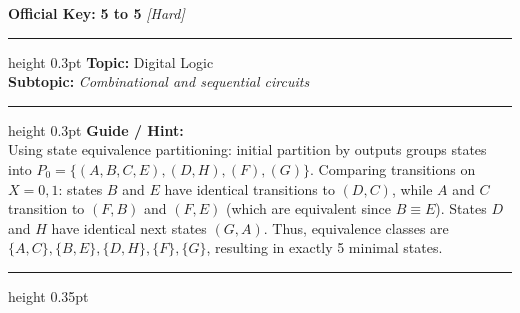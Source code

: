 \documentclass[a4paper,10pt]{article}
\begin{document}
\begin{tcolorbox}
\textbf{Official Key:} \textbf{\large 5 to 5} \hfill \textit{\small [Hard]}
\vspace{2pt}\hrule height 0.3pt\vspace{3pt}
\textbf{Topic:} Digital Logic \\
\textbf{Subtopic:} \textit{Combinational and sequential circuits}
\vspace{2pt}\hrule height 0.3pt\vspace{3pt}
\textbf{Guide / Hint:} \\
{\small Using state equivalence partitioning: initial partition by outputs groups states into $P_0 = \{(A, B, C, E), (D, H), (F), (G)\}$. Comparing transitions on $X=0, 1$: states $B$ and $E$ have identical transitions to $(D, C)$, while $A$ and $C$ transition to $(F, B)$ and $(F, E)$ (which are equivalent since $B \equiv E$). States $D$ and $H$ have identical next states $(G, A)$. Thus, equivalence classes are $\{A, C\}, \{B, E\}, \{D, H\}, \{F\}, \{G\}$, resulting in exactly 5 minimal states.}

\end{tcolorbox}
\vspace{6pt}\hrule height 0.35pt\vspace{6pt}
\noindent
\end{document}
